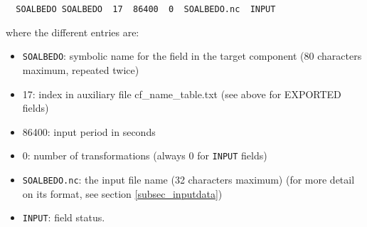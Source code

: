   \begin{verbatim}
  SOALBEDO SOALBEDO  17  86400  0  SOALBEDO.nc  INPUT
  \end{verbatim}
\vspace{-0.5cm}
where the different entries are:
\begin{itemize}
\item {\tt SOALBEDO}: symbolic name for the field in the target component
  (80 characters maximum, repeated twice)
\item 17: index in auxiliary file cf\_name\_table.txt (see above for
  EXPORTED fields)
\item 86400: input period in seconds
\item 0: number of transformations (always 0 for {\tt INPUT} fields)
\item {\tt SOALBEDO.nc}:  the input file name (32 characters maximum)
  (for more detail on its format, see section \ref{subsec_inputdata})
\item {\tt INPUT}: field status.
\end{itemize}

